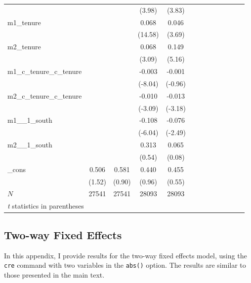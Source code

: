 \documentclass[bib]{statapress}
\begin{document}
\begin{table}[H]
{\begin{tabular}{l*{4}{c}cccccccc}
            &            &            &      (3.98)&      (3.83)\\
m1\_tenure   &            &            &       0.068&       0.046\\
            &            &            &     (14.58)&      (3.69)\\
m2\_tenure   &            &            &       0.068&       0.149\\
            &            &            &      (3.09)&      (5.16)\\
m1\_c\_tenure\_c\_tenure&            &            &      -0.003&      -0.001\\
            &            &            &     (-8.04)&     (-0.96)\\
m2\_c\_tenure\_c\_tenure&            &            &      -0.010&      -0.013\\
            &            &            &     (-3.09)&     (-3.18)\\
m1\_\_1\_south &            &            &      -0.108&      -0.076\\
            &            &            &     (-6.04)&     (-2.49)\\
m2\_\_1\_south &            &            &       0.313&       0.065\\
            &            &            &      (0.54)&      (0.08)\\
\_cons      &       0.506&       0.581&       0.440&       0.455\\
            &      (1.52)&      (0.90)&      (0.96)&      (0.55)\\
\hline
\(N\)       &       27541&       27541&       28093&       28093\\
\hline\hline
\multicolumn{5}{l}{\footnotesize \textit{t} statistics in parentheses}\\
\end{tabular}

}

\end{table}%

\subsection*{Two-way Fixed Effects}\label{sec-appendix2}

In this appendix, I provide results for the two-way fixed effects model,
using the \texttt{cre} command with two variables in the \texttt{abs()}
option. The results are similar to those presented in the main text.
\end{document}
